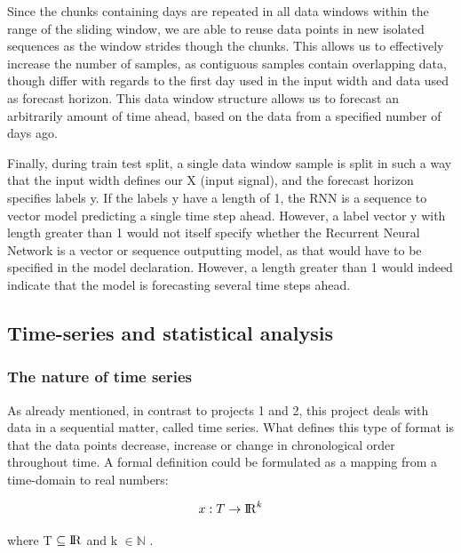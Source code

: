 \documentclass
[twocolumn,
secnumarabic,
nobibnotes,
aps,
prl,
reprint,
groupedaddress,
amsmath,
amssymb,
]{revtex4-2}
\begin{document}
Since the chunks containing days are repeated in all data windows within the range of the sliding window, we are able to reuse data points in new isolated sequences as the window strides though the chunks. This allows us to effectively increase the number of samples, as contiguous samples contain overlapping data, though differ with regards to the first day used in the input width and data used as forecast horizon. This data window structure allows us to forecast an arbitrarily amount of time ahead, based on the data from a specified number of days ago.

Finally, during train test split, a single data window sample is split in such a way that the input width defines our X (input signal), and the forecast horizon specifies labels y. If the labels y have a length of 1, the RNN is a sequence to vector model predicting a single time step ahead. However, a label vector y with length greater than 1 would not itself specify whether the Recurrent Neural Network is a vector or sequence outputting model, as that would have to be specified in the model declaration. However, a length greater than 1 would indeed indicate that the model is forecasting several time steps ahead. 

\subsection{Time-series and statistical analysis}

\subsubsection{The nature of time series}
As already mentioned, in contrast to projects 1 and 2, this project deals with data in a sequential matter, called time series. What defines this type of format is that the data points decrease, increase or change in chronological order throughout time\cite{Vishwas2020}. A formal definition could be formulated as a mapping from a time-domain to real numbers:

\begin{equation}
  x: T \rightarrow {\rm I\!R}^k 
\end{equation}

where T $\subseteq {\rm I\!R}$ and k $\in \mathbb{N}$ \cite{Auffarth2021}.
\end{document}
